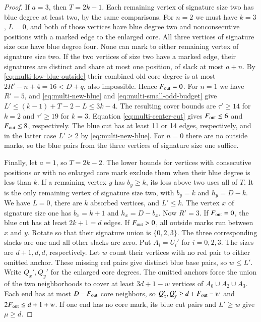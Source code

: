 \begin{proof}
If $a=3$, then $T=2k-1$. Each remaining vertex of signature
size two has blue degree at least two, by the same comparisons.
For $n=2$ we must have $k=3$, $L=0$, and both of those vertices
have blue degree two and nonconsecutive positions with a marked
edge to the enlarged core. All three vertices of signature size
one have blue degree four. None can mark to either remaining
vertex of signature size two. If the two vertices of size two
have a marked edge, their signatures are distinct and share at
most one position, of slack at most $a+n$. By
\eqref{eq:multi-low-blue-outside} their combined old core degree
is at most $2R'-n+4=16<D+q$, also impossible. Hence $F_{\rm out}=0$.
For $n=1$ we have $R'=5$, and
\eqref{eq:multi-new-blue} and \eqref{eq:multi-small-odd-budget}
give $L'\le(k-1)+T-2-L\le3k-4$. The resulting cover bounds
are $\tau'\ge14$ for $k=2$ and $\tau'\ge19$ for $k=3$.
Equation \eqref{eq:multi-center-cut} gives $F_{\rm out}\le6$ and $F_{\rm out}\le8$,
respectively. The blue cut has at least 11 or 14 edges,
respectively, and in the latter case $L'\ge2$ by
\eqref{eq:multi-new-blue}. For $n=0$ there are no outside marks,
so the blue pairs from the three vertices of signature size
one suffice.

Finally, let $a=1$, so $T=2k-2$. The lower bounds for vertices
with consecutive positions or with no enlarged core mark
exclude them when their blue degree is less than $k$. If a
remaining vertex $y$ has $b_y\ge k$, its loss above two uses
all of $T$. It is the only remaining vertex of signature size
two, with $b_y=k$ and $h_y=D-k$. We have $L=0$, there are $k$
absorbed vertices, and $L'\le k$. The vertex $x$ of signature size
one has $b_x=k+1$ and $h_x=D-b_x$. Now $R'=3$. If $F_{\rm out}=0$, the
blue cut has at least $2k+1=d$ edges. If $F_{\rm out}>0$, all outside
marks run between $x$ and $y$. Rotate so that their signature union
is $\{0,2,3\}$. The three corresponding slacks are one and all
other slacks are zero. Put $A_i=U_i'$ for $i=0,2,3$. The sizes
are $d+1,d,d$, respectively. Let $w$ count their vertices
with no red pair to either omitted anchor. These missing red
pairs give distinct blue base pairs, so $w\le L'$. Write
$Q_x',Q_y'$ for the enlarged core degrees. The omitted anchors
force the union of the two neighborhoods to cover at least
$3d+1-w$ vertices of $A_0\cup A_2\cup A_3$. Each end has at most
$D-F_{\rm out}$ core neighbors, so $Q_x',Q_y'\ge d+F_{\rm out}-w$ and
$2F_{\rm out}\le d+1+w$. If one end has no core mark, its blue cut pairs
and $L'\ge w$ give $\mu\ge d$.


\end{proof}
